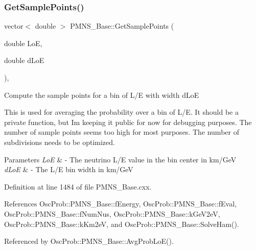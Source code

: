 \subsubsection{\texorpdfstring{Get\+Sample\+Points()}{GetSamplePoints()}}
{\footnotesize\ttfamily vector$<$ double $>$ P\+M\+N\+S\+\_\+\+Base\+::\+Get\+Sample\+Points (\begin{DoxyParamCaption}\item[{double}]{LoE,  }\item[{double}]{d\+LoE }\end{DoxyParamCaption})\hspace{0.3cm}{\ttfamily [virtual]}, {\ttfamily [inherited]}}

Compute the sample points for a bin of L/E with width d\+LoE

This is used for averaging the probability over a bin of L/E. It should be a private function, but I\textquotesingle{}m keeping it public for now for debugging purposes. The number of sample points seems too high for most purposes. The number of subdivisions needs to be optimized.


\begin{DoxyParams}{Parameters}
{\em LoE} & -\/ The neutrino L/E value in the bin center in km/\+GeV \\
\hline
{\em d\+LoE} & -\/ The L/E bin width in km/\+GeV \\
\hline
\end{DoxyParams}


Definition at line 1484 of file P\+M\+N\+S\+\_\+\+Base.\+cxx.



References Osc\+Prob\+::\+P\+M\+N\+S\+\_\+\+Base\+::f\+Energy, Osc\+Prob\+::\+P\+M\+N\+S\+\_\+\+Base\+::f\+Eval, Osc\+Prob\+::\+P\+M\+N\+S\+\_\+\+Base\+::f\+Num\+Nus, Osc\+Prob\+::\+P\+M\+N\+S\+\_\+\+Base\+::k\+Ge\+V2eV, Osc\+Prob\+::\+P\+M\+N\+S\+\_\+\+Base\+::k\+Km2eV, and Osc\+Prob\+::\+P\+M\+N\+S\+\_\+\+Base\+::\+Solve\+Ham().



Referenced by Osc\+Prob\+::\+P\+M\+N\+S\+\_\+\+Base\+::\+Avg\+Prob\+Lo\+E().


